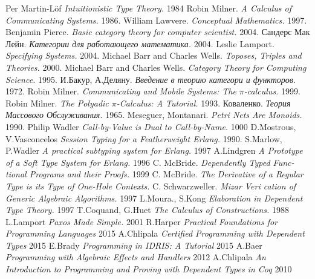 \documentclass[11pt,oneside]{article}
\begin{document}
\newpage
\begin{thebibliography}{9}

      Per Martin-Löf \textit{Intuitionistic Type Theory.} 1984
     Robin Milner. \textit{ A Calculus of Communicating Systems.} 1986.
  William Lawvere. \textit{Conceptual Mathematics.} 1997.
   Benjamin Pierce. \textit{Basic category theory for computer scientist.} 2004.
   Сандерс Мак Лейн. \textit{Категории для работающего математика.} 2004.
      Leslie Lamport. \textit{Specifying Systems.} 2004.
  Michael Barr and Charles Wells. \textit{Toposes, Triples and Theories.} 2000.
  Michael Barr and Charles Wells. \textit{Category Theory for Computing Science.} 1995.
    И.Бакур, А.Деляну. \textit{Введение в теорию категори и функторов.} 1972.
   Robin Milner. \textit{Communicating and Mobile Systems: The $\pi$-calculus.} 1999.
   Robin Milner. \textit{The Polyadic $\pi$-Calculus: A Tutorial.} 1993.
     Коваленко. \textit{Теория Массового Обслуживания.} 1965.
 Meseguer, Montanari.  \textit{Petri Nets Are Monoids.} 1990.
  Philip Wadler \textit{Call-by-Value is Dual to Call-by-Name.} 1000
   D.Mostrous, V.Vasconcelos \textit{Session Typing for a Featherweight Erlang.} 1990.
   S.Marlow, P.Wadler \textit{A practical subtyping system for Erlang.} 1997
   A.Lindgren \textit{A Prototype of a Soft Type System for Erlang.} 1996
  C. McBride. \textit{Dependently Typed Func- tional Programs and their Proofs.} 1999
 C. McBride. \textit{The Derivative of a Regular Type is its Type of One-Hole Contexts.}
  C. Schwarzweller. \textit{Mizar Veri cation of Generic Algebraic Algorithms.} 1997
  L.Moura., S.Kong \textit{Elaboration in Dependent Type Theory.} 1997
  T.Coquand, G.Huet \textit{The Calculus of Constructions.} 1988
   L.Lamport \textit{Paxos Made Simple.} 2001
    R.Harper \textit{Practical Foundations for Programming Languages} 2015
   A.Chlipala \textit{Certified Programming with Dependent Types} 2015
    E.Brady \textit{Programming in IDRIS: A Tutorial} 2015
     A.Baer \textit{Programming with Algebraic Effects and Handlers} 2012
 A.Chlipala \textit{An Introduction to Programming and Proving with Dependent Types in Coq} 2010

\end{thebibliography}
\end{document}
